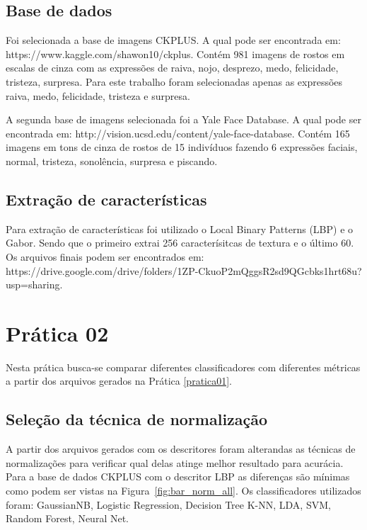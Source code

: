 \documentclass[a4paper, 12 pt, conference]{ieeeconf}  %
\begin{document}
\subsection{Base de dados}
Foi selecionada a base de imagens CKPLUS. A qual pode ser encontrada em: https://www.kaggle.com/shawon10/ckplus. Contém 981 imagens de rostos em escalas de cinza com as expressões de raiva, nojo, desprezo, medo, felicidade, tristeza, surpresa. Para este trabalho foram selecionadas apenas as expressões raiva, medo, felicidade, tristeza e surpresa.

A segunda base de imagens selecionada foi a Yale Face Database. A qual pode ser encontrada em: http://vision.ucsd.edu/content/yale-face-database. Contém 165 imagens em tons de cinza de rostos de 15 indivíduos fazendo 6 expressões faciais, normal, tristeza, sonolência, surpresa e piscando.

\subsection{Extração de características}
Para extração de características foi utilizado o Local Binary Patterns (LBP) e o Gabor. Sendo que o primeiro extrai 256 caracterísitcas de textura e o último 60. Os arquivos finais podem ser encontrados em: https://drive.google.com/drive/folders/1ZP-CkuoP2mQggsR2sd9QGcbks1hrt68u?usp=sharing.

\section{Prática 02}
\label{pratica02}
Nesta prática busca-se comparar diferentes classificadores com diferentes métricas a partir dos arquivos gerados na Prática \ref{pratica01}.

\subsection{Seleção da técnica de normalização}
A partir dos arquivos gerados com os descritores foram alterandas as técnicas de normalizações para verificar qual delas atinge melhor resultado para acurácia. Para a base de dados CKPLUS com o descritor LBP as diferenças são mínimas como podem ser vistas na Figura~\ref{fig:bar_norm_all}. Os classificadores utilizados foram: GaussianNB, Logistic Regression, Decision Tree K-NN, LDA, SVM, Random Forest, Neural Net.
\end{document}
